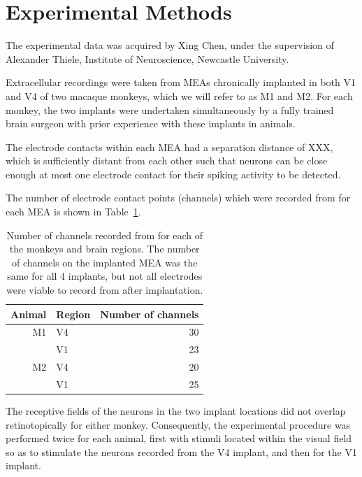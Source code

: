 \section{Experimental Methods}
\label{ch:exp}

The experimental data was acquired by Xing Chen, under the supervision of Alexander Thiele, Institute of Neuroscience, Newcastle University.

Extracellular recordings were taken from \acp{MEA} chronically implanted in both \ac{V1} and \ac{V4} of two macaque monkeys, which we will refer to as \ac{M1} and \ac{M2}.
For each monkey, the two implants were undertaken simultaneously by a fully trained brain surgeon with prior experience with these implants in animals.

The electrode contacts within each \ac{MEA} had a separation distance of XXX,%
which is sufficiently distant from each other such that neurons can be close enough at most one electrode contact for their spiking activity to be detected.%

The number of electrode contact points (channels) which were recorded from for each \ac{MEA} is shown in Table~\ref{tab:nchannels}.

\begin{table}[hbtp]
\caption{Number of channels recorded from for each of the monkeys and brain regions.
The number of channels on the implanted \ac{MEA} was the same for all 4 implants, but not all electrodes were viable to record from after implantation.}
\label{tab:nchannels}
\begin{center}
\begin{tabular}{rlr}
\toprule
Animal  & Region    & Number of channels \\
\midrule
M1      & V4        & 30 \\
        & V1        & 23 \\
M2      & V4        & 20 \\
        & V1        & 25 \\
\bottomrule
\end{tabular}
\end{center}
\end{table}

The receptive fields of the neurons in the two implant locations did not overlap retinotopically for either monkey.
Consequently, the experimental procedure was performed twice for each animal, first with stimuli located within the visual field so as to stimulate the neurons recorded from the \ac{V4} implant, and then for the \ac{V1} implant.


